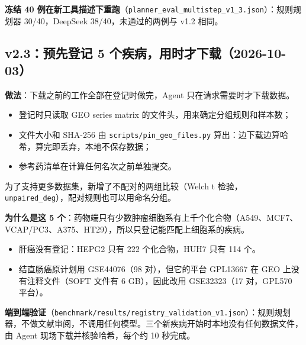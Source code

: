 \documentclass[
  10pt,
]{ctexart}
\providecommand{\tightlist}{%
  \setlength{\itemsep}{0pt}\setlength{\parskip}{0pt}}
\begin{document}
\textbf{冻结 40
例在新工具描述下重跑}（\texttt{planner\_\allowbreak{}eval\_\allowbreak{}multistep\_\allowbreak{}v1\_\allowbreak{}3.\allowbreak{}json}）：规则规划器
30/40，DeepSeek 38/40，未通过的两例与 v1.2 相同。

\subsection{v2.3：预先登记 5
个疾病，用时才下载（2026-10-03）}\label{v23ux9884ux5148ux767bux8bb0-5-ux4e2aux75beux75c5ux7528ux65f6ux624dux4e0bux8f7d2026-10-03}

\textbf{做法}：下载之前的工作全部在登记时做完，Agent
只在请求需要时才下载数据。

\begin{itemize}
\tightlist
\item
  登记时只读取 GEO series matrix 的文件头，用来确定分组规则和样本数；
\item
  文件大小和 SHA-256 由 \texttt{scripts/\allowbreak{}pin\_\allowbreak{}geo\_\allowbreak{}files.\allowbreak{}py}
  算出：边下载边算哈希，算完即丢弃，本地不保存数据；
\item
  参考药清单在计算任何名次之前单独提交。
\end{itemize}

为了支持更多数据集，新增了不配对的两组比较（Welch t
检验，\texttt{unpaired\_\allowbreak{}deg}），配对规则也可以用命名分组。

\textbf{为什么是这 5
个}：药物端只有少数肿瘤细胞系有上千个化合物（A549、MCF7、VCAP/PC3、A375、HT29），所以只登记能匹配上细胞系的疾病。

\begin{itemize}
\tightlist
\item
  肝癌没有登记：HEPG2 只有 222 个化合物，HUH7 只有 114 个。
\item
  结直肠癌原计划用 GSE44076（98 对），但它的平台 GPL13667 在 GEO
  上没有注释文件（SOFT 文件有 6 GB），因此改用 GSE32323（17 对，GPL570
  平台）。
\end{itemize}

\textbf{端到端验证}（\texttt{benchmark/\allowbreak{}results/\allowbreak{}registry\_\allowbreak{}validation\_\allowbreak{}v1.\allowbreak{}json}）：规则规划器，不做文献审阅，不调用任何模型。三个新疾病开始时本地没有任何数据文件，由
Agent 现场下载并核验哈希，每个约 10 秒完成。
\end{document}
